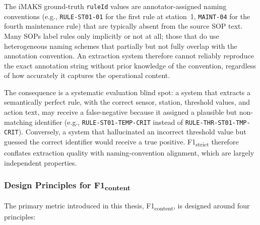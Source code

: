﻿\documentclass[11pt]{article}
\begin{document}
The iMAKS ground-truth \texttt{ruleId} values are annotator-assigned naming
conventions (e.g., \texttt{RULE-ST01-01} for the first rule at station~1,
\texttt{MAINT-04} for the fourth maintenance rule) that are typically absent
from the source SOP text.
Many SOPs label rules only implicitly or not at all; those that do use
heterogeneous naming schemes that partially but not fully overlap with the
annotation convention.
An extraction system therefore cannot reliably reproduce the exact annotation
string without prior knowledge of the convention, regardless of how accurately
it captures the operational content.

The consequence is a systematic evaluation blind spot: a system that extracts
a semantically perfect rule, with the correct sensor, station, threshold values,
and action text, may receive a false-negative because it assigned a plausible
but non-matching identifier (e.g., \texttt{RULE-ST01-TEMP-CRIT} instead of
\texttt{RULE-THR-ST01-TMP-CRIT}).
Conversely, a system that hallucinated an incorrect threshold value but guessed
the correct identifier would receive a true positive.
F1\textsubscript{strict} therefore conflates extraction quality with
naming-convention alignment, which are largely independent properties.

\subsubsection{Design Principles for F1\textsubscript{content}}
\label{sec:f1content_rationale}

The primary metric introduced in this thesis, F1\textsubscript{content}, is
designed around four principles:
\end{document}
